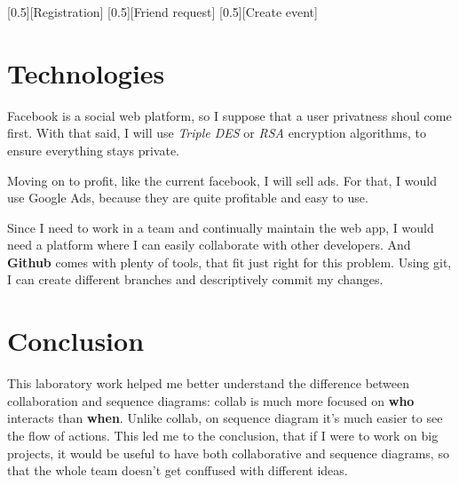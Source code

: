 \documentclass{article}
\begin{document}
		[0.5][Registration]
		[0.5][Friend request]
		[0.5][Create event]

	\section{Technologies}
		Facebook is a social web platform, so I suppose that a user privatness shoul come first. With that said, I will use \textit{Triple DES} or \textit{RSA} encryption algorithms, to ensure everything stays private.
		
		Moving on to profit, like the current facebook, I will sell ads. For that, I would use Google Ads, because they are quite profitable and easy to use.

		Since I need to work in a team and continually maintain the web app, I would need a platform where I can easily collaborate with other developers. And \textbf{Github} comes with plenty of tools, that fit just right for this problem. Using git, I can create different branches and descriptively commit my changes.

	\section{Conclusion}
		This laboratory work helped me better understand the difference between collaboration and sequence diagrams: collab is much more focused on \textbf{who} interacts than \textbf{when}. Unlike collab, on sequence diagram it's much easier to see the flow of actions. This led me to the conclusion, that if I were to work on big projects, it would be useful to have both collaborative and sequence diagrams, so that the whole team doesn't get conffused with different ideas.
\end{document}
